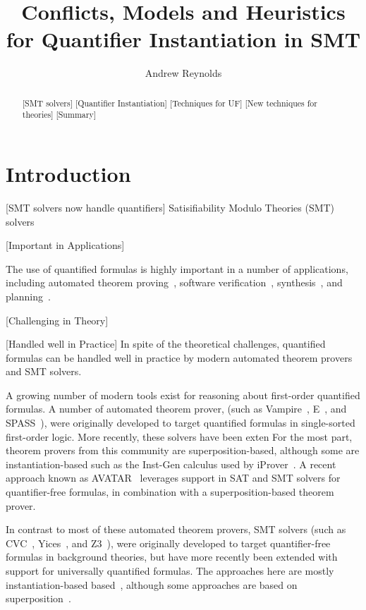 \documentclass[oribibl]{llncs}
\begin{document}
\title{Conflicts, Models and Heuristics for Quantifier Instantiation in SMT}

\author {Andrew Reynolds}

\maketitle

\pagestyle{plain}

\begin{abstract}
[SMT solvers]
[Quantifier Instantiation]
[Techniques for UF]
[New techniques for theories]
[Summary]
\end{abstract}

\section{Introduction}

[SMT solvers now handle quantifiers]
Satisifiability Modulo Theories (SMT) solvers 

[Important in Applications]

The use of quantified formulas is highly important in a number of applications,
including automated theorem proving~\cite{}, software verification~\cite{}, synthesis~\cite{}, and planning~\cite{}.

[Challenging in Theory]


[Handled well in Practice]
In spite of the theoretical challenges, quantified formulas
can be handled well in practice by modern automated theorem provers and SMT solvers.


A growing number of modern tools exist for reasoning about first-order quantified formulas.
A number of automated theorem prover,
(such as Vampire~\cite{}, E~\cite{}, and SPASS~\cite{}), were originally developed to target 
quantified formulas in single-sorted first-order logic.
More recently, these solvers have been exten
For the most part, theorem provers from this community are superposition-based,
although some are instantiation-based such as the Inst-Gen calculus used by iProver~\cite{}.
A recent approach known as AVATAR~\cite{} leverages support in SAT and SMT solvers for quantifier-free formulas,
in combination with a superposition-based theorem prover.

In contrast to most of these automated theorem provers, 
SMT solvers (such as CVC~\cite{}, Yices~\cite{}, and Z3~\cite{}), 
were originally developed to target quantifier-free formulas in background theories,
but have more recently been extended with support for universally quantified formulas.
The approaches here are mostly instantiation-based based~\cite{},
although some approaches are based on superposition~\cite{}.
\end{document}
